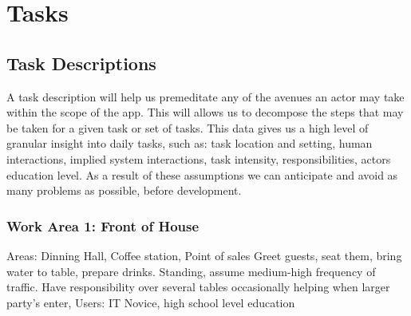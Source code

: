 \documentclass{article}
\begin{document}
\section{Tasks}
\subsection{Task Descriptions}
A task description will help us premeditate any of the avenues an actor may take within the scope of the app. This will allows us to decompose the steps that may be taken for a given task or set of tasks. This data gives us a high level of granular insight into daily tasks, such as: task location and setting, human interactions, implied system interactions, task intensity, responsibilities, actors education level. As a result of these assumptions we can anticipate and avoid as many problems as possible, before development.

\subsubsection{Work Area 1: Front of House}
Areas: Dinning Hall, Coffee station, Point of sales
Greet guests, seat them, bring water to table, prepare drinks. 
Standing, assume medium-high frequency of traffic.
Have responsibility over several tables occasionally helping when larger party's enter,
Users: IT Novice, high school level education
\end{document}
